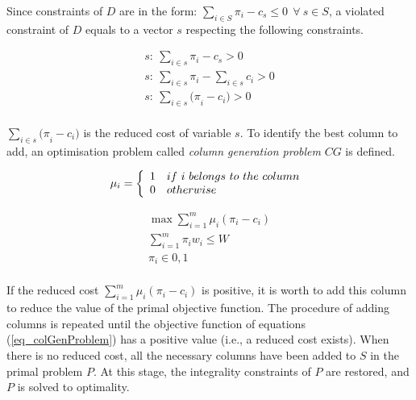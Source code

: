 Since constraints of $D$ are in the form: $\sum_{i\in S}{\pi_i-c_s\le0\ \ \forall\ s\in S}$, a violated constraint of $D$ equals to a vector $s$ respecting the following constraints.

\begin{equation}
\begin{split}
    s:\ \sum_{i\in s}{\pi_i-c_s>0}\\
    s:\ \sum_{i\in s}{\pi_i-\sum_{i\in s} c_i>0}\\
    s:\ \sum_{i\in s}{{(\pi}_i-c_i)>0}\\
\end{split}
\end{equation}

$\sum_{i\in s}{{(\pi}_i-c_i)}$ is the reduced cost of variable $s$. To identify the best column to add, an optimisation problem called \textit{column generation problem} $CG$ is defined.

\begin{equation}
	\mu_i=\left\{
                \begin{array}{ll}
                  1 & if\ i\ belongs\ to\ the\ column\\
                  0 & otherwise\\
                \end{array}
              \right.\\
\end{equation}

\begin{equation}
\begin{split}
    \max{\sum_{i=1}^{m}{\mu_i(\pi_i-c_i)}}\\
    \sum_{i=1}^{m}{\pi_iw_i\le W}\\
    \pi_i\in{0,1}\\
\end{split}
\label{eq_colGenProblem}
\end{equation}

If the reduced cost $\sum_{i=1}^{m}{\mu_i(\pi_i-c_i)}$ is positive, it is worth to add this column to reduce the value of the primal objective function. The procedure of adding columns is repeated until the objective function of equations (\ref{eq_colGenProblem})  has a positive value (i.e., a reduced cost exists). When there is no reduced cost, all the necessary columns have been added to $S$ in the primal problem $P$. At this stage, the integrality constraints of $P$ are restored, and $P$ is solved to optimality. \par

